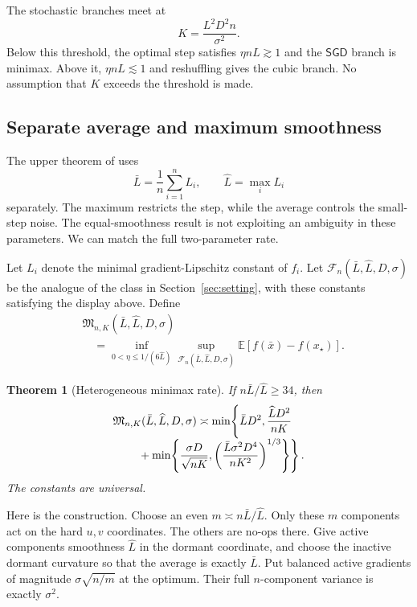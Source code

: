 \documentclass[twoside]{article}
\newtheorem{theorem}{Theorem}
\newcommand{\E}{\mathbb E}
\newcommand{\cF}{\mathcal F}
\newcommand{\SGD}{\mathsf{SGD}}
\begin{document}
The stochastic branches meet at
\begin{equation}
 K=\frac{L^2D^2n}{\sigma^2}.
 \label{eq:transition}
\end{equation}
Below this threshold, the optimal step satisfies $\eta nL\gtrsim1$ and the $\SGD$ branch is minimax. Above it, $\eta nL\lesssim1$ and reshuffling gives the cubic branch. No assumption that $K$ exceeds the threshold is made.

\subsection{Separate average and maximum smoothness}
\label{sec:heterogeneous}

The upper theorem of \citet{liu2026dominates} uses \[ \bar L=\frac1n\sum_{i=1}^nL_i, \qquad \widehat L=\max_iL_i \] separately. The maximum restricts the step, while the average controls the small-step noise. The equal-smoothness result is not exploiting an ambiguity in these parameters. We can match the full two-parameter rate.

Let $L_i$ denote the minimal gradient-Lipschitz constant of $f_i$. Let $\cF_n(\bar L,\widehat L,D,\sigma)$ be the analogue of the class in Section~\ref{sec:setting}, with these constants satisfying the display above. Define
\begin{equation}
\begin{aligned}
 &\mathfrak M_{n,K}(\bar L,\widehat L,D,\sigma)\\
 &\quad=\inf_{0<\eta\le1/(6\widehat L)}
 \sup_{\cF_n(\bar L,\widehat L,D,\sigma)}
 \E[f(\bar x)-f(x_\star)].
\end{aligned}
 \label{eq:minimax-hetero}
\end{equation}

\begin{theorem}[Heterogeneous minimax rate]
\label{thm:heterogeneous}
If $n\bar L/\widehat L\ge34$, then
\begin{align}
 \mathfrak M_{n,K}(\bar L,\widehat L,D,\sigma)
 \asymp
 \min\!\left\{\bar LD^2,\frac{\widehat LD^2}{nK}\right.\quad\notag\\[-1ex]
 \left.{}+\min\!\left\{
 \frac{\sigma D}{\sqrt{nK}},
 \left(\frac{\bar L\sigma^2D^4}{nK^2}\right)^{1/3}
 \right\}\right\}.
 \label{eq:minimax-hetero-rate}
\end{align}
The constants are universal.
\end{theorem}

Here is the construction. Choose an even $m\asymp n\bar L/\widehat L$. Only these $m$ components act on the hard $u,v$ coordinates. The others are no-ops there. Give active components smoothness $\widehat L$ in the dormant coordinate, and choose the inactive dormant curvature so that the average is exactly $\bar L$. Put balanced active gradients of magnitude $\sigma\sqrt{n/m}$ at the optimum. Their full $n$-component variance is exactly $\sigma^2$.
\end{document}
